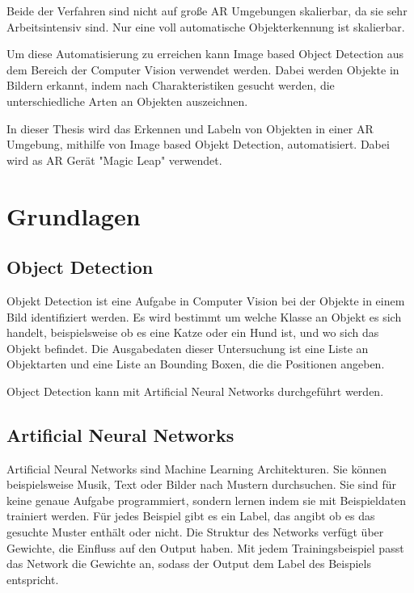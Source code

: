 \documentclass[german,a4paper, 12pt]{llncs}
\begin{document}
Beide der Verfahren sind nicht auf große AR Umgebungen skalierbar, da sie sehr Arbeitsintensiv sind. Nur eine voll automatische Objekterkennung ist skalierbar. 

Um diese Automatisierung zu erreichen kann Image based Object Detection aus dem Bereich der Computer Vision verwendet werden.
Dabei werden Objekte in Bildern erkannt, indem nach Charakteristiken gesucht werden, die unterschiedliche Arten an Objekten auszeichnen.\cite{introToCNN}

In dieser Thesis wird das Erkennen und Labeln von Objekten in einer AR Umgebung, mithilfe von Image based Objekt Detection, automatisiert. 
Dabei wird as AR Gerät "Magic Leap" verwendet. 


\section{Grundlagen}

\subsection*{Object Detection}
Objekt Detection ist eine Aufgabe in Computer Vision bei der Objekte in einem Bild identifiziert werden. Es wird bestimmt um welche Klasse an Objekt es sich handelt, beispielsweise ob es eine Katze oder ein Hund ist, und wo sich das Objekt befindet. Die Ausgabedaten dieser Untersuchung ist eine Liste an Objektarten und eine Liste an Bounding Boxen, die die Positionen angeben.

Object Detection kann mit Artificial Neural Networks durchgeführt werden.  

\subsection*{Artificial Neural Networks}
Artificial Neural Networks sind Machine Learning Architekturen. Sie können beispielsweise Musik, Text oder Bilder nach Mustern durchsuchen. Sie sind für keine genaue Aufgabe programmiert, sondern lernen indem sie mit Beispieldaten trainiert werden. Für jedes Beispiel gibt es ein Label, das angibt ob es das gesuchte Muster enthält oder nicht. Die Struktur des Networks verfügt über Gewichte, die Einfluss auf den Output haben. Mit jedem Trainingsbeispiel passt das Network die Gewichte an, sodass der Output dem Label des Beispiels entspricht.\cite{introToCNN,surveyOfDeepLearing}
\end{document}
